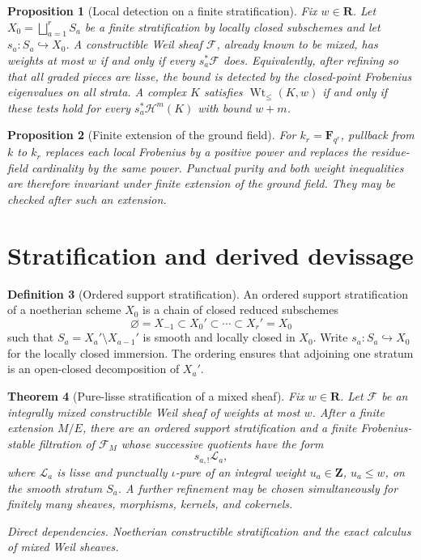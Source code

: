 \documentclass[10pt]{article}
\newtheorem{theorem}{Theorem}[section]
\newtheorem{proposition}[theorem]{Proposition}
\theoremstyle{definition}
\newtheorem{definition}[theorem]{Definition}
\newcommand{\WtLe}{\operatorname{Wt}_{\leq}}
\newcommand{\dep}[1]{\par\smallskip\noindent\textit{Direct dependencies.} #1\par}
\begin{document}
\begin{proposition}[Local detection on a finite stratification]
Fix \(w\in\mathbf R\).  Let
\(X_0=\bigsqcup_{a=1}^rS_a\) be a finite stratification by locally
closed subschemes and let \(s_a:S_a\hookrightarrow X_0\).  A constructible
Weil sheaf \(\mathcal F\), already known to be mixed, has weights at most
\(w\) if and only if every \(s_a^*\mathcal F\) does.  Equivalently, after
refining so that all graded pieces are lisse, the bound is detected by the
closed-point Frobenius eigenvalues on all strata.  A complex \(K\) satisfies
\(\WtLe(K,w)\) if and only if these tests hold for every
\(s_a^*\mathcal H^m(K)\) with bound \(w+m\).
\end{proposition}

\begin{proposition}[Finite extension of the ground field]
For \(k_r=\mathbf F_{q^r}\), pullback from \(k\) to \(k_r\) replaces each
local Frobenius by a positive power and replaces the residue-field cardinality
by the same power.  Punctual purity and both weight inequalities are
therefore invariant under finite extension of the ground field.  They may
be checked after such an extension.
\end{proposition}

\section{Stratification and derived devissage}

\begin{definition}[Ordered support stratification]
An ordered support stratification of a noetherian scheme \(X_0\) is a chain
of closed reduced subschemes
\[
 \varnothing=X_{-1}\subset X_0'\subset\cdots\subset X_r'=X_0
\]
such that \(S_a=X_a'\setminus X_{a-1}'\) is smooth and locally closed in
\(X_0\).  Write \(s_a:S_a\hookrightarrow X_0\) for the locally closed
immersion.  The ordering ensures that adjoining one stratum is an
open-closed decomposition of \(X_a'\).
\end{definition}

\begin{theorem}[Pure-lisse stratification of a mixed sheaf]
Fix \(w\in\mathbf R\).  Let \(\mathcal F\) be an integrally mixed constructible Weil sheaf of
weights at most \(w\).  After a finite extension \(M/E\), there are an ordered support
stratification and a finite Frobenius-stable filtration of
\(\mathcal F_M\) whose successive quotients have the form
\[
                         s_{a,!}\mathcal L_a,
\]
where \(\mathcal L_a\) is lisse and punctually \(\iota\)-pure of an integral weight
\(u_a\in\mathbf Z\), \(u_a\le w\), on the smooth stratum \(S_a\).  A further refinement may be
chosen simultaneously for finitely many sheaves, morphisms, kernels, and
cokernels.
\dep{Noetherian constructible stratification and the exact calculus of
mixed Weil sheaves.}
\end{theorem}
\end{document}
